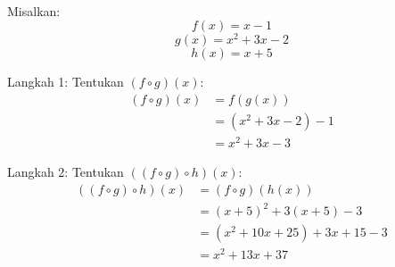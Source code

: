 \begin{example}
  \hfill \\
  Misalkan:
  \[ f(x) = x - 1 \]
  \[ g(x) = x^2 + 3x - 2 \]
  \[ h(x) = x + 5 \]
  
  Langkah 1: Tentukan $(f \circ g)(x)$:
  \[
  \begin{aligned}
    (f \circ g)(x) &= f(g(x)) \\
    &= (x^2 + 3x - 2) - 1 \\
    &= x^2 + 3x - 3
  \end{aligned}
  \]
  
  Langkah 2: Tentukan $((f \circ g) \circ h)(x)$:
  \[
  \begin{aligned}
    ((f \circ g) \circ h)(x) &= (f \circ g)(h(x)) \\
    &= (x + 5)^2 + 3(x + 5) - 3 \\
    &= (x^2 + 10x + 25) + 3x + 15 - 3 \\
    &= x^2 + 13x + 37
  \end{aligned}
  \]
\end{example}
